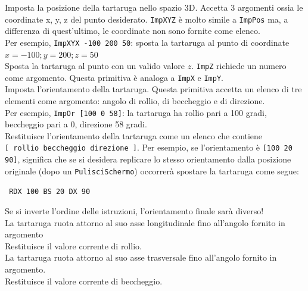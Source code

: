 Imposta la posizione della tartaruga nello spazio 3D. Accetta 3 argomenti ossia le coordinate x, y, z del punto desiderato. \texttt{ImpXYZ} è molto simile a \texttt{ImpPos} ma, a differenza di quest'ultimo, le coordinate non sono fornite come elenco. \\
Per esempio, \texttt{ImpXYX -100 200 50}: sposta la tartaruga al punto di coordinate $x=-100;y=200;z=50$\\
Sposta la tartaruga al punto con un valido valore $z$. \texttt{ImpZ} richiede un numero come argomento. Questa primitiva è analoga a \texttt{ImpX} e \texttt{ImpY}. \\
Imposta l'orientamento della tartaruga. Questa primitiva accetta un elenco di tre elementi come argomento: angolo di rollio, di beccheggio e di direzione.\\
Per esempio, \texttt{ImpOr [100 0 58]}: la tartaruga ha rollio pari a 100 gradi, beccheggio pari a 0, direzione 58 gradi.\\
Restituisce l'orientamento della tartaruga come un elenco che contiene \texttt{[~rollio~beccheggio~direzione~]}. Per esempio, se l'orientamento è \texttt{[100 20 90]}, significa che se si desidera replicare lo stesso orientamento dalla posizione originale (dopo un \texttt{PulisciSchermo}) occorrerà spostare la tartaruga come segue:
\begin{center}
	\texttt{ RDX 100 BS 20 DX 90}
\end{center}
Se si inverte l'ordine delle istruzioni, l'orientamento finale sarà diverso!\\
La tartaruga ruota attorno al suo asse longitudinale fino all'angolo fornito in argomento\\
Restituisce il valore corrente di rollio.\\
La tartaruga ruota attorno al suo asse trasversale fino all'angolo fornito in argomento.\\
Restituisce il valore corrente di beccheggio.
